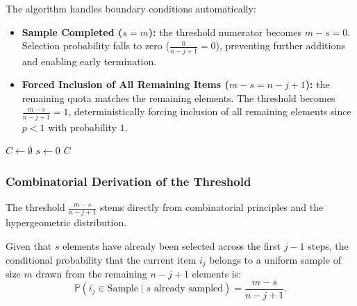 The algorithm handles boundary conditions automatically:
\begin{itemize}
  \item \textbf{Sample Completed ($s = m$):} the threshold numerator becomes $m - s = 0$. Selection probability falls to zero ($\frac{0}{n - j + 1} = 0$), preventing further additions and enabling early termination.
  \item \textbf{Forced Inclusion of All Remaining Items ($m - s = n - j + 1$):} the remaining quota matches the remaining elements. The threshold becomes $\frac{m - s}{n - j + 1} = 1$, deterministically forcing inclusion of all remaining elements since $p < 1$ with probability $1$.
\end{itemize}

\begin{algorithm}[H]
  \caption{Algorithm S (Selection Sampling by Fan, Muller, Rezucha / Knuth)}
  \label{alg:algorithm-s}
  $C \leftarrow \emptyset$\;
  $s \leftarrow 0$
  \Return $C$\;
\end{algorithm}

\subsubsection{Combinatorial Derivation of the Threshold}
The threshold $\frac{m - s}{n - j + 1}$ stems directly from combinatorial principles and the hypergeometric distribution.

\begin{theorem}
Given that $s$ elements have already been selected across the first $j - 1$ steps, the conditional probability that the current item $i_j$ belongs to a uniform sample of size $m$ drawn from the remaining $n - j + 1$ elements is:
\begin{equation}
  \mathbb{P}(i_j \in \text{Sample} \mid s \text{ already sampled}) = \frac{m - s}{n - j + 1}.
\end{equation}
\end{theorem}

